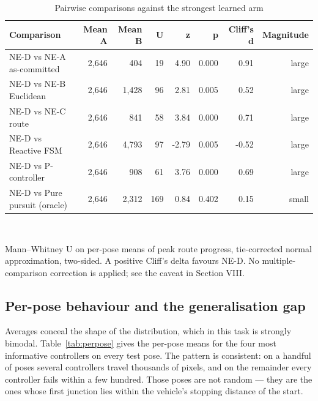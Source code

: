 \documentclass[conference]{IEEEtran}
\begin{document}
\begin{table}[!t]
\caption{Pairwise comparisons against the strongest learned arm}
\label{tab:tests}
\centering
\footnotesize
\begin{tabular}{lrrrrrrr}
\toprule
Comparison & Mean A & Mean B & U & z & p & Cliff's d & Magnitude \\
\midrule
NE-D vs NE-A as-committed & 2,646 & 404 & 19 & 4.90 & 0.000 & 0.91 & large \\
NE-D vs NE-B Euclidean & 2,646 & 1,428 & 96 & 2.81 & 0.005 & 0.52 & large \\
NE-D vs NE-C route & 2,646 & 841 & 58 & 3.84 & 0.000 & 0.71 & large \\
NE-D vs Reactive FSM & 2,646 & 4,793 & 97 & -2.79 & 0.005 & -0.52 & large \\
NE-D vs P-controller & 2,646 & 908 & 61 & 3.76 & 0.000 & 0.69 & large \\
NE-D vs Pure pursuit (oracle) & 2,646 & 2,312 & 169 & 0.84 & 0.402 & 0.15 & small \\
\bottomrule
\end{tabular}
\\[2pt]\parbox{\linewidth}{\scriptsize Mann–Whitney U on per-pose means of peak route progress, tie-corrected normal approximation, two-sided. A positive Cliff's delta favours NE-D. No multiple-comparison correction is applied; see the caveat in Section VIII.}
\end{table}

\subsection{Per-pose behaviour and the generalisation gap}

Averages conceal the shape of the distribution, which in this task is strongly bimodal. Table~\ref{tab:perpose} gives the per-pose means for the four most informative controllers on every test pose. The pattern is consistent: on a handful of poses several controllers travel thousands of pixels, and on the remainder every controller fails within a few hundred. Those poses are not random — they are the ones whose first junction lies within the vehicle's stopping distance of the start.
\end{document}
